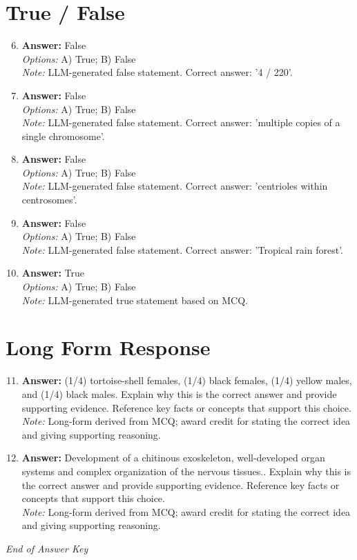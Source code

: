 \documentclass[12pt]{article}
\begin{document}
\section*{True / False}
\begin{enumerate}[label=\arabic*.]
\setcounter{enumi}{5}
\item \textbf{Answer:} False
\\ \textit{Options:} A) True; B) False
\\ \textit{Note:} LLM-generated false statement. Correct answer: '4 / 220'.
\item \textbf{Answer:} False
\\ \textit{Options:} A) True; B) False
\\ \textit{Note:} LLM-generated false statement. Correct answer: 'multiple copies of a single chromosome'.
\item \textbf{Answer:} False
\\ \textit{Options:} A) True; B) False
\\ \textit{Note:} LLM-generated false statement. Correct answer: 'centrioles within centrosomes'.
\item \textbf{Answer:} False
\\ \textit{Options:} A) True; B) False
\\ \textit{Note:} LLM-generated false statement. Correct answer: 'Tropical rain forest'.
\item \textbf{Answer:} True
\\ \textit{Options:} A) True; B) False
\\ \textit{Note:} LLM-generated true statement based on MCQ.
\end{enumerate}

\section*{Long Form Response}
\begin{enumerate}[label=\arabic*.]
\setcounter{enumi}{10}
\item \textbf{Answer:} (1/4) tortoise-shell females, (1/4) black females, (1/4) yellow males, and (1/4) black males. Explain why this is the correct answer and provide supporting evidence. Reference key facts or concepts that support this choice.
\\ \textit{Note:} Long-form derived from MCQ; award credit for stating the correct idea and giving supporting reasoning.
\item \textbf{Answer:} Development of a chitinous exoskeleton, well-developed organ systems and complex organization of the nervous tissues.. Explain why this is the correct answer and provide supporting evidence. Reference key facts or concepts that support this choice.
\\ \textit{Note:} Long-form derived from MCQ; award credit for stating the correct idea and giving supporting reasoning.
\end{enumerate}

\vfill
\noindent\textit{End of Answer Key}
\end{document}
